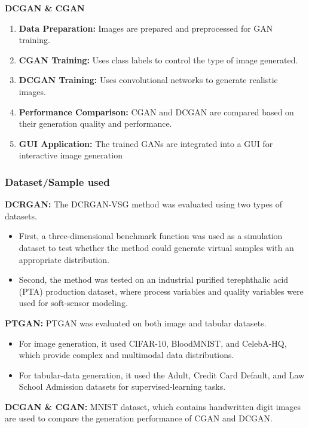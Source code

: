 \documentclass[12pt,a4paper]{article}
\begin{document}
\textbf{DCGAN \& CGAN}
\begin{enumerate}
    \item \textbf{Data Preparation:} Images are prepared and preprocessed for GAN training.
    \item \textbf{CGAN Training:} Uses class labels to control the type of image generated.
    \item \textbf{DCGAN Training:} Uses convolutional networks to generate realistic images.
    \item \textbf{Performance Comparison:} CGAN and DCGAN are compared based on their generation quality and performance.
    \item \textbf{GUI Application:} The trained GANs are integrated into a GUI for interactive image generation
\end{enumerate}

\subsubsection{Dataset/Sample used}
\textbf{DCRGAN:} The DCRGAN-VSG method was evaluated using two types of datasets. 
\begin{itemize}
    \item First, a three-dimensional benchmark function was used as a simulation dataset to test whether the method could generate virtual samples with an appropriate distribution.
    \item Second, the method was tested on an industrial purified terephthalic acid (PTA) production dataset, where process variables and quality variables were used for soft-sensor modeling.
\end{itemize}
\textbf{PTGAN:} PTGAN was evaluated on both image and tabular datasets.
\begin{itemize}
    \item For image generation, it used CIFAR-10, BloodMNIST, and CelebA-HQ, which provide complex and multimodal data distributions.
    \item For tabular-data generation, it used the Adult, Credit Card Default, and Law School Admission datasets for supervised-learning tasks.
\end{itemize}
\textbf{DCGAN \& CGAN:} MNIST dataset, which contains handwritten digit images are used to compare the generation performance of CGAN and DCGAN.
\end{document}
